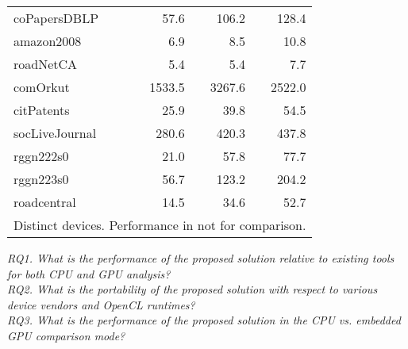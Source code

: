 \begin{table}[tbp]
\begin{center}
\begin{tabular}{|l|r|r|r|}
    \rowcolor{black!2 } coPapersDBLP&57.6&106.2&128.4\\
    \rowcolor{black!10} amazon2008&6.9&8.5&10.8\\
    \rowcolor{black!2 } roadNetCA&5.4&5.4&7.7\\
    \rowcolor{black!10} comOrkut&1533.5&3267.6&2522.0\\
    \rowcolor{black!2 } citPatents&25.9&39.8&54.5\\
    \rowcolor{black!10} socLiveJournal&280.6&420.3&437.8\\
    \rowcolor{black!2 } rggn222s0&21.0&57.8&77.7\\
    \rowcolor{black!10} rggn223s0&56.7&123.2&204.2\\
    \rowcolor{black!2 } roadcentral&14.5&34.6&52.7\\
    \hline
    \hline
    \multicolumn{4}{l}{Distinct devices. Performance in not for comparison.} \\
    \end{tabular}
    \label{rq2_table}
\end{center}
\end{table}

\textit{RQ1. What is the performance of the proposed solution relative to existing tools for both CPU and GPU analysis?}\\

\textit{RQ2. What is the portability of the proposed solution with respect to various device vendors and OpenCL runtimes?}\\

\textit{RQ3. What is the performance of the proposed solution in the CPU vs. embedded GPU comparison mode?}\\


